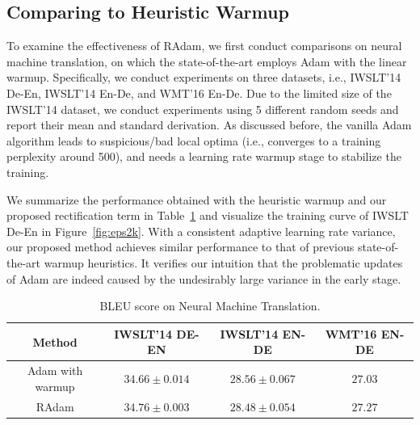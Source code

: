 \subsection{Comparing to Heuristic Warmup}
\vspace{-0.1cm}
To examine the effectiveness of RAdam, we first conduct comparisons on neural machine translation, on which the state-of-the-art employs Adam with the linear warmup.
Specifically, we conduct experiments on three datasets, i.e., IWSLT'14 De-En, IWSLT'14 En-De, and WMT'16 En-De. 
Due to the limited size of the IWSLT'14 dataset, we conduct experiments using 5 different random seeds and report their mean and standard derivation. 
As discussed before, the vanilla Adam algorithm leads to suspicious/bad local optima (i.e., converges to a training perplexity around 500), and needs a learning rate warmup stage to stabilize the training. 

We summarize the performance obtained with the heuristic warmup and our proposed rectification term in Table~\ref{tab:nmt} and visualize the training curve of IWSLT De-En in Figure~\ref{fig:eps2k}.
With a consistent adaptive learning rate variance, our proposed method achieves similar performance to that of previous state-of-the-art warmup heuristics. 
It verifies our intuition that the problematic updates of Adam are indeed caused by the undesirably large variance in the early stage. 

\begin{table}[t]
    \centering
\vspace{-0.2cm}
    \caption{BLEU score on Neural Machine Translation. 
    }
\vspace{-0.2cm}
    \label{tab:nmt}
    \begin{tabular}{c|c|c|c}
         Method & IWSLT'14 DE-EN & IWSLT'14 EN-DE & WMT'16 EN-DE \\
         \hline
         Adam with warmup  & $34.66 \pm 0.014$ & $28.56 \pm 0.067$ & $27.03$\\
         RAdam   & $34.76 \pm 0.003$ & $28.48 \pm 0.054$ & $27.27$\\
    \end{tabular}
\vspace{-0.6cm}
\end{table}

